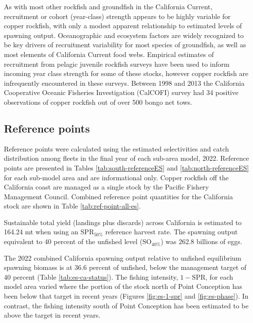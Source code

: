 \documentclass[11pt,
  letterpaper,
]{article}
\begin{document}
As with most other rockfish and groundfish in the California Current, recruitment or cohort (year-class) strength appears to be highly variable for copper rockfish, with only a modest apparent relationship to estimated levels of spawning output. Oceanographic and ecosystem factors are widely recognized to be key drivers of recruitment variability for most species of groundfish, as well as most elements of California Current food webs. Empirical estimates of recruitment from pelagic juvenile rockfish surveys have been used to inform incoming year class strength for some of these stocks, however copper rockfish are infrequently encountered in these surveys. Between 1998 and 2013 the California Cooperative Oceanic Fisheries Investigation (CalCOFI) survey had 34 positive observations of copper rockfish out of over 500 bongo net tows.

\subsection*{Reference points}\label{reference-points}

Reference points were calculated using the estimated selectivities and catch distribution among fleets in the final year of each sub-area model, 2022. Reference points are presented in Tables \ref{tab:south-referenceES} and \ref{tab:north-referenceES} for each sub-model area and are informational only. Copper rockfish off the California coast are managed as a single stock by the Pacific Fishery Management Council. Combined reference point quantities for the California stock are shown in Table \ref{tab:ref-point-all-es}.

Sustainable total yield (landings plus discards) across California is estimated to 164.24 mt when using an \(\text{SPR}_{50\%}\) reference harvest rate. The spawning output equivalent to 40 percent of the unfished level (\(\text{SO}_{40\%}\)) was 262.8 billions of eggs.

The 2022 combined California spawning output relative to unfished equilibrium spawning biomass is at 36.6 percent of unfished, below the management target of 40 percent (Table \ref{tab:es-ca-status}). The fishing intensity, \(1-\text{SPR}\), for each model area varied where the portion of the stock north of Point Conception has been below that target in recent years (Figures \ref{fig:es-1-spr} and \ref{fig:es-phase}). In contrast, the fishing intensity south of Point Conception has been estimated to be above the target in recent years.
\end{document}
